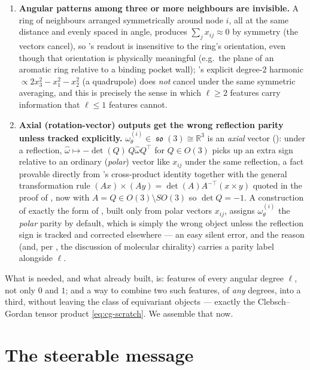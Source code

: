 \documentclass[11pt,a4paper]{report}
\theoremstyle{definition}
\theoremstyle{remark}
\DeclareMathOperator{\so}{\mathfrak{so}}
\newcommand{\RR}{\mathbb R}
\begin{document}
\begin{enumerate}
\item \textbf{Angular patterns among three or more neighbours are invisible.}
A ring of neighbours arranged symmetrically around node $i$, all at the
same distance and evenly spaced in angle, produces $\sum_jx_{ij}\approx0$
by symmetry (the vectors cancel), so 's readout is
insensitive to the ring's orientation, even though that orientation is
physically meaningful (e.g.\ the plane of an aromatic ring relative to a
binding pocket wall); 's explicit degree-$2$
harmonic $\propto2x_3^2-x_1^2-x_2^2$ (a quadrupole) does \emph{not} cancel
under the same symmetric averaging, and this is precisely the sense in
which $\ell\ge2$ features carry information that $\ell\le1$ features
cannot.
\item \textbf{Axial (rotation-vector) outputs get the wrong reflection
parity unless tracked explicitly.} $\omega^{(i)}_\theta\in\so(3)\cong\RR^3$
is an \emph{axial} vector (): under a reflection,
$\widehat\omega\mapsto -\det(Q)\,Q\widehat\omega Q^\top$ for $Q\in O(3)$
picks up an extra sign relative to an ordinary (\emph{polar}) vector like
$x_{ij}$ under the same reflection, a fact provable directly from
's cross-product identity together with the general
transformation rule $(Ax)\times(Ay)=\det(A)A^{-\top}(x\times y)$ quoted in
the proof of , now with $A=Q\in O(3)\setminus SO(3)$
so $\det Q=-1$. A construction of exactly the form of
, built only from polar vectors $x_{ij}$, assigns
$\omega_\theta^{(i)}$ the \emph{polar} parity by default, which is simply
the wrong object unless the reflection sign is tracked and corrected
elsewhere --- an easy silent error, and the reason 
(and, per , the discussion of molecular chirality)
carries a parity label alongside $\ell$.
\end{enumerate}

What is needed, and what  already built, is: features
of every angular degree $\ell$, not only $0$ and $1$; and a way to combine
two such features, of \emph{any} degrees, into a third, without leaving the
class of equivariant objects --- exactly the Clebsch--Gordan tensor product
\eqref{eq:cg-scratch}. We assemble that now.

\section{The steerable message}
\label{sec:the-steerable-message}
\end{document}
